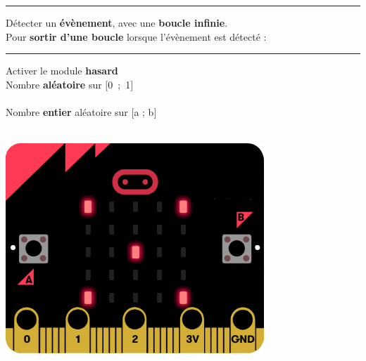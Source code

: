 \begin{remarque}
	\rule{-0.25em}{1.7em}
	Détecter un \textbf{évènement}, avec une \textbf{boucle infinie}.
	\hfill	\ex {}\\
	
	Pour \textbf{sortir d'une boucle} lorsque l'évènement est détecté :
	\hfill \ex {}\\
\end{remarque}

\begin{minipage}{0.75\linewidth}
	\begin{methode}[Aléa]
		\rule{-0.25em}{2em}
			Activer le module \textbf{hasard}
			\hfill {}\\
			
			Nombre \textbf{aléatoire} sur $[$0~;~1$]$
			\hfill  {}\\
			\hfill \ex {}\\
			
			Nombre \textbf{entier} aléatoire sur $[$a ; b$]$
			\hfill  {}\\
			\hfill \ex {}\\
	\end{methode}
\end{minipage}
\hfill 
\begin{minipage}{0.25\linewidth}
	\begin{center}
		\includegraphics[width=0.8\linewidth]{res/mbpy-de.png}
	\end{center}
\end{minipage}






